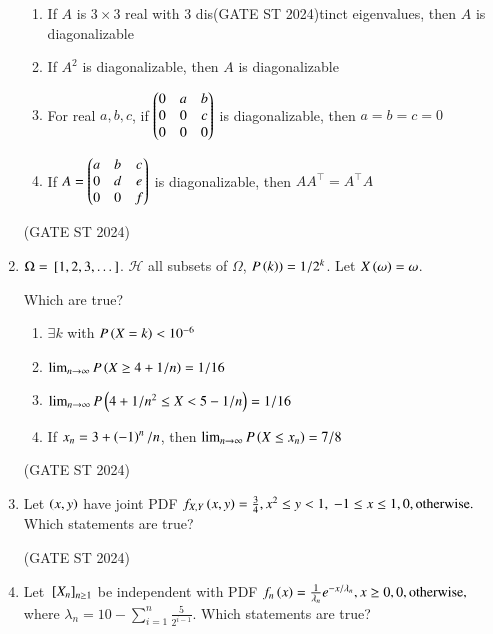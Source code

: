 \documentclass[journal,12pt,onecolumn]{IEEEtran}
\theoremstyle{remark}
\begin{document}
\begin{enumerate}
\begin{enumerate}
\item If $A$ is $3\times3$ real with 3 dis\hfill (GATE ST 2024)tinct eigenvalues, then $A$ is diagonalizable
\item If $A^2$ is diagonalizable, then $A$ is diagonalizable
\item For real $a,b,c$, if $\begin{pmatrix}0&a&b\\0&0&c\\0&0&0\end{pmatrix}$ is diagonalizable, then $a=b=c=0$
\item If $A=\begin{pmatrix}a&b&c\\0&d&e\\0&0&f\end{pmatrix}$ is diagonalizable, then $AA^\top = A^\top A$
\end{enumerate}
\hfill (GATE ST 2024)
\item
$\Omega={}\left[1,2,3,\dots\right]$. $\mathcal{H}$ all subsets of $\Omega$, $P\left(k\right)) = 1/2^k$. Let $X\left(\omega\right) = \omega$.

Which are true?
\begin{enumerate}
\item $\exists k$ with $P\left(X=k\right) < 10^{-6}$
\item $\lim_{n\to\infty} P\left(X \ge 4 + 1/n\right) = 1/16$
\item $\lim_{n\to\infty} P\left(4 + 1/n^2 \le X < 5 - 1/n\right) = 1/16$
\item If $x_n = 3 + \left(-1\right)^n/n$, then $\lim_{n\to\infty} P\left(X \le x_n\right) = 7/8$
\end{enumerate}
\hfill (GATE ST 2024)
\item
Let $\left(x,y\right)$ have joint PDF
$
f_{X,Y}\left(x,y\right) =
\frac34,  x^2 \le y < 1,\ -1 \le x \le 1,\\
0,  \text{otherwise}.
$
Which statements are true?
\begin{enumerate}
\end{enumerate}
\hfill (GATE ST 2024)
\item
Let ${}\left[X_n\right]_{n\ge 1}$ be independent with PDF
$
f_n\left(x\right) =
\frac{1}{\lambda_n} e^{-x/\lambda_n}, x \ge 0,\\
0,  \text{otherwise},
$
where $\lambda_n = 10 - \sum_{i=1}^n \frac{5}{2^{i-1}}$.
Which statements are true?


\end{enumerate}
\end{document}

